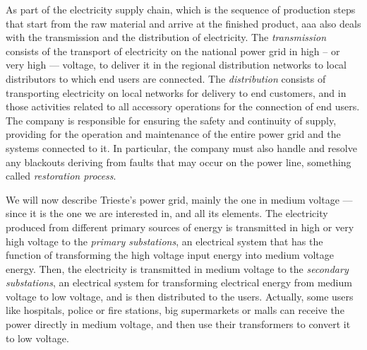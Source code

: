 As part of the electricity supply chain,
which is the sequence of production steps that start from the raw material and arrive at the finished product, %
\acrshort{aaa} also deals with the transmission and the distribution of electricity. The \emph{transmission} consists of the transport of electricity on the national power grid in high -- or very high --- voltage, to deliver it in the regional distribution networks to local distributors to which end users are connected. The \emph{distribution} consists of transporting electricity on local networks for delivery to end customers, and in those activities related to all accessory operations for the connection of end users. The company is responsible for ensuring the safety and continuity of supply, providing for the operation and maintenance of the entire power grid and the systems connected to it. In particular, the company must also handle and resolve any blackouts deriving from faults that may occur on the power line, something called \emph{restoration process}.

We will now describe Trieste's power grid, mainly the one in medium voltage --- since it is the one we are interested in, and all its elements.  The electricity produced from different primary sources of energy is transmitted in high or very high voltage to the \emph{primary substations}, an electrical system that has the function of transforming the high voltage input energy into medium voltage energy. Then, the electricity is transmitted in medium voltage to the \emph{secondary substations}, an electrical system for transforming electrical energy from medium voltage to low voltage, and is then distributed to the users. Actually, some users like hospitals, police or fire stations, big supermarkets or malls can receive the power directly in medium voltage, and then use their transformers to convert it to low voltage.

